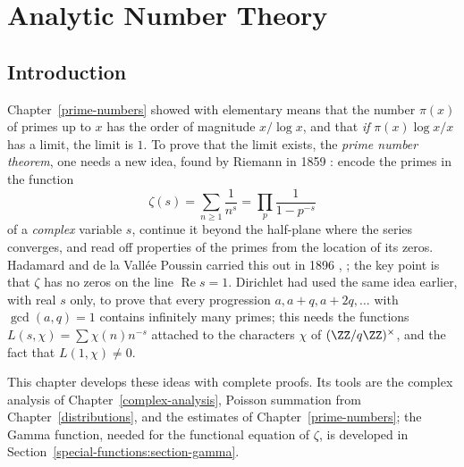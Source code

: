 \chapter{Analytic Number Theory}\label{analytic-number-theory}

\section{Introduction}\label{analytic-number-theory:section-introduction}

Chapter~\ref{prime-numbers} showed with elementary means that the number $\pi(x)$ of primes up to $x$ has the order of magnitude $x/\log x$, and that \emph{if} $\pi(x)\log x/x$ has a limit, the
limit is $1$. To prove that the limit exists, the \emph{prime number theorem}, one needs a new idea, found by Riemann in 1859 \cite{riemann-1859}: encode the primes in the function
\[
\zeta(s) = \sum_{n \geq 1}\frac{1}{n^s} = \prod_p\frac{1}{1 - p^{-s}}
\]
of a \emph{complex} variable $s$, continue it beyond the half-plane where the series converges, and read off properties of the primes from the location of its zeros. Hadamard and de la
Vall\'ee Poussin carried this out in 1896 \cite{hadamard-1896}, \cite{de-la-vallee-poussin-1896}; the key point is that $\zeta$ has no zeros on the line $\operatorname{Re}s = 1$. Dirichlet had
used the same idea earlier, with real $s$ only, to prove that every progression $a, a + q, a + 2q, \ldots$ with $\gcd(a, q) = 1$ contains infinitely many primes; this needs the
functions $L(s, \chi) = \sum\chi(n)n^{-s}$ attached to the characters $\chi$ of $(\ZZ/q\ZZ)^\times$, and the fact that $L(1, \chi) \neq 0$.

This chapter develops these ideas with complete proofs. Its tools are the complex analysis of Chapter~\ref{complex-analysis}, Poisson summation from Chapter~\ref{distributions}, and the
estimates of Chapter~\ref{prime-numbers}; the Gamma function, needed for the functional equation of $\zeta$, is developed in Section~\ref{special-functions:section-gamma}.

